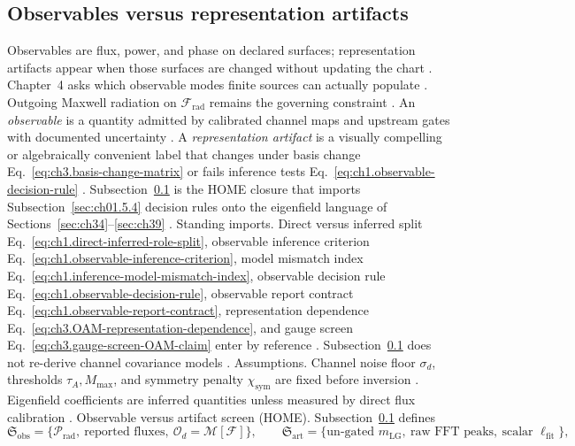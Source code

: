 \subsection{Observables versus representation artifacts}
\label{sec:ch394}
Observables are flux, power, and phase on declared surfaces; representation artifacts appear when those surfaces are changed without updating the chart \cite{stratton1941}. Chapter~4 asks which observable modes finite sources can actually populate \cite{chu1948}. Outgoing Maxwell radiation on $\mathcal{F}_{\mathrm{rad}}$ remains the governing constraint \cite{stratton1941}.
An \emph{observable} is a quantity admitted by calibrated channel maps and upstream gates with documented uncertainty
\cite{harrington2001}. A \emph{representation artifact} is a visually compelling or algebraically convenient
label that changes under basis change Eq.~\eqref{eq:ch3.basis-change-matrix} or fails inference tests
Eq.~\eqref{eq:ch1.observable-decision-rule} \cite{hansen1988}. Subsection~\ref{sec:ch394} is the HOME closure that
imports Subsection~\ref{sec:ch01.5.4} decision rules onto the eigenfield language of Sections~\ref{sec:ch34}--\ref{sec:ch39}
\cite{harrington2001}.
Standing imports. Direct versus inferred split Eq.~\eqref{eq:ch1.direct-inferred-role-split}, observable inference criterion
Eq.~\eqref{eq:ch1.observable-inference-criterion}, model mismatch index Eq.~\eqref{eq:ch1.inference-model-mismatch-index},
observable decision rule Eq.~\eqref{eq:ch1.observable-decision-rule}, observable report contract
Eq.~\eqref{eq:ch1.observable-report-contract}, representation dependence Eq.~\eqref{eq:ch3.OAM-representation-dependence}, and gauge screen
Eq.~\eqref{eq:ch3.gauge-screen-OAM-claim} enter by reference \cite{harrington2001}. Subsection~\ref{sec:ch394}
does not re-derive channel covariance models \cite{harrington2001}.
Assumptions. Channel noise floor \(\sigma_d\), thresholds \(\tau_A,M_{\max}\), and symmetry penalty \(\chi_{\mathrm{sym}}\) are fixed before inversion
\cite{harrington2001}. Eigenfield coefficients are inferred quantities unless measured by direct flux calibration
\cite{poynting1884}.
Observable versus artifact screen (HOME). Subsection~\ref{sec:ch394} defines
\begin{equation}
\label{eq:ch3.observable-vs-artifact-screen}
\mathfrak{S}_{\mathrm{obs}}
=
\bigl\{\mathcal{P}_{\mathrm{rad}},\ \text{reported fluxes},\ \mathcal{O}_d=\mathcal{M}[\mathcal{F}]\bigr\},
\qquad
\mathfrak{S}_{\mathrm{art}}
=
\bigl\{\text{un-gated }m_{\mathrm{LG}},\ \text{raw FFT peaks},\ \text{scalar }\ell_{\mathrm{fit}}\bigr\},
\end{equation}
